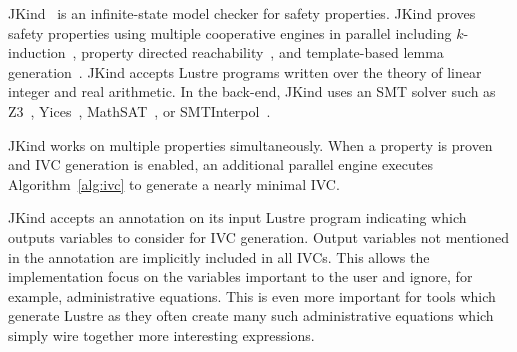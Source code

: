 JKind~\cite{jkind} is an infinite-state model checker for safety
properties. JKind proves safety properties using multiple cooperative
engines in parallel including $k$-induction~\cite{SheeranSS00},
property directed reachability~\cite{Een2011:PDR}, and template-based
lemma generation~\cite{Kahsai2011}. JKind accepts Lustre programs
written over the theory of linear integer and real arithmetic. In the
back-end, JKind uses an SMT solver such as Z3~\cite{DeMoura08:z3},
Yices~\cite{Dutertre06:yices}, MathSAT~\cite{Cimatti2013:MathSAT}, or
SMTInterpol~\cite{Christ2012:SMTInterpol}.

JKind works on multiple properties simultaneously. When a property is
proven and IVC generation is enabled, an additional parallel engine
executes Algorithm~\ref{alg:ivc} to generate a nearly minimal IVC.

JKind accepts an annotation on its input Lustre program indicating
which outputs variables to consider for IVC generation. Output
variables not mentioned in the annotation are implicitly included in
all IVCs. This allows the implementation focus on the variables
important to the user and ignore, for example, administrative
equations. This is even more important for tools which generate Lustre
as they often create many such administrative equations which simply
wire together more interesting expressions.

